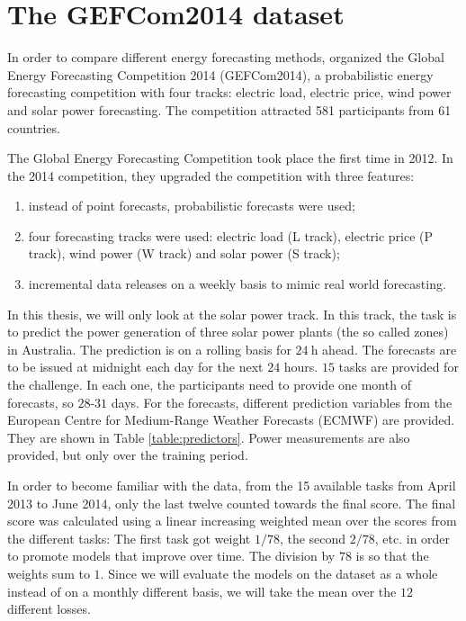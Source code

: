 \section{The GEFCom2014 dataset}

In order to compare different energy forecasting methods, 
\Textcite{Hong2016} organized the Global Energy Forecasting Competition 2014 (GEFCom2014), 
a probabilistic energy forecasting competition with four tracks: 
electric load, electric price, wind power and solar power forecasting. 
The competition attracted 581 participants from 61 countries. 

The Global Energy Forecasting Competition took place the first time in 2012. 
In the 2014 competition, they upgraded the competition with three features: 
\begin{enumerate}
    \item instead of point forecasts, probabilistic forecasts were used;
    \item four forecasting tracks were used: electric load (L track), 
    electric price (P track), wind power (W track) and solar power (S track);
    \item incremental data releases on a weekly basis to mimic real world forecasting.
\end{enumerate}

In this thesis, we will only look at the solar power track. 
In this track, the task is to predict the power generation of three 
solar power plants (the so called zones) in Australia. 
The prediction is on a rolling basis for \(\SI{24}{\hour}\) ahead. 
The forecasts are to be issued at midnight each day for the next \(24\) hours. 
\(15\) tasks are provided for the challenge. In each one, the participants need to 
provide one month of forecasts, so \(28\)-\(31\) days.
For the forecasts, different prediction variables from the 
European Centre for Medium-Range Weather Forecasts (ECMWF) are provided. 
They are shown in Table \ref{table:predictors}.
Power measurements are also provided, but only over the training period. 

In order to become familiar with the data, from the 15 available tasks from April 2013 to June 2014, 
only the last twelve counted towards the final score. 
The final score was calculated using a linear increasing weighted mean over the scores from the different tasks: 
The first task got weight \(1/78\), the second \(2/78\), etc. 
in order to promote models that improve over time. The division by \(78\) is so that the 
weights sum to \(1\).
Since we will evaluate the models on the dataset as a whole instead of on a monthly different basis, 
we will take the mean over the \(12\) different losses.

